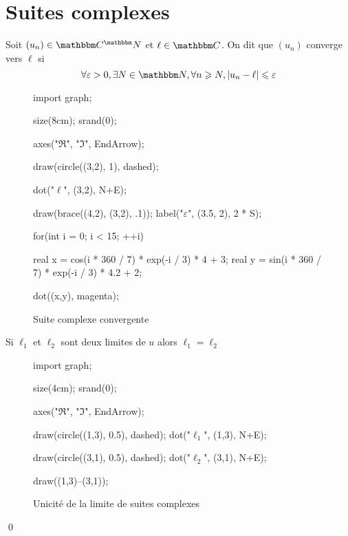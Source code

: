 \part{Suites complexes}

\begin{defn}
	Soit $(u_n) \in \C^\N$ et $\ell\in \C$. On dit que $(u_n)$ converge vers $\ell$ si \[
		\forall \varepsilon>0, \exists N \in \N, \forall n \ge  N, \left| u_n-\ell \right| \le \varepsilon
	\] 
	
	\begin{figure}[H]
		\begin{center}
			\begin{asy}
				import graph;

				size(8cm); srand(0);

				axes("$\Re$", "$\Im$", EndArrow);

				draw(circle((3,2), 1), dashed);

				dot("$\ell$", (3,2), N+E);

				draw(brace((4,2), (3,2), .1));
				label("$\varepsilon$", (3.5, 2), 2 * S);

				for(int i = 0; i < 15; ++i) {
					real x = cos(i * 360 / 7) * exp(-i / 3) * 4 + 3;
					real y = sin(i * 360 / 7) * exp(-i / 3) * 4.2 + 2;

					dot((x,y), magenta);
				}

			\end{asy}
		\end{center}
		\caption{Suite complexe convergente}
	 	\label{suite-complexe-convergente}
	\end{figure}
\end{defn}

\begin{prop}
	Si $\ell_1$ et $\ell_2$ sont deux limites de $u$ alors $\ell_1= \ell_2$ 
	\begin{figure}[H]
		\begin{center}
			\begin{asy}
				import graph;

				size(4cm); srand(0);

				axes("$\Re$", "$\Im$", EndArrow);

				draw(circle((1,3), 0.5), dashed);
				dot("$\ell_1$", (1,3), N+E);

				draw(circle((3,1), 0.5), dashed);
				dot("$\ell_2$", (3,1), N+E);
				
				draw((1,3)--(3,1));
			\end{asy}
		\end{center}
		\caption{Unicité de la limite de suites complexes}
	 	\label{unicite-limite-complexe}
	\end{figure}
	\qed
\end{prop}

